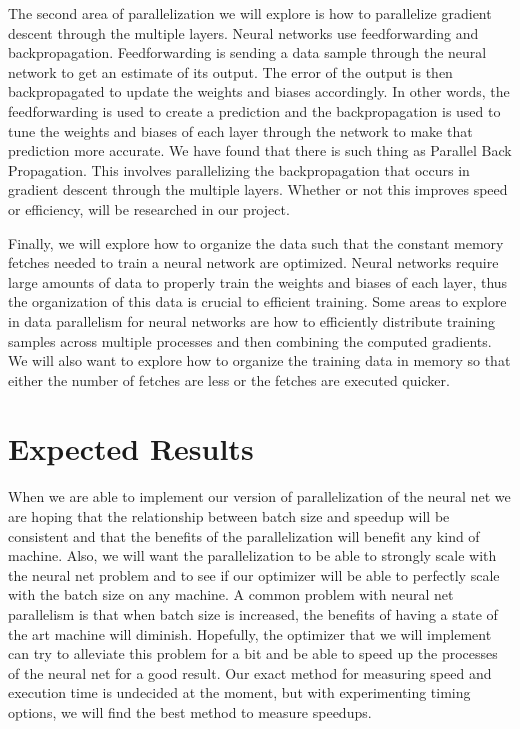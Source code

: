 \documentclass[twoside,twocolumn]{article}
\begin{document}
The second area of parallelization we will explore is how to parallelize gradient descent through the multiple layers. Neural networks use feedforwarding and backpropagation. Feedforwarding is sending a data sample through the neural network to get an estimate of its output. The error of the output is then backpropagated to update the weights and biases accordingly. In other words, the feedforwarding is used to create a prediction and the backpropagation is used to tune the weights and biases of each layer through the network to make that prediction more accurate. We have found that there is such thing as Parallel Back Propagation. This involves parallelizing the backpropagation that occurs in gradient descent through the multiple layers. Whether or not this improves speed or efficiency, will be researched in our project. 

Finally, we will explore how to organize the data such that the constant memory fetches needed to train a neural network are optimized. Neural networks require large amounts of data to properly train the weights and biases of each layer, thus the organization of this data is crucial to efficient training. Some areas to explore in data parallelism for neural networks are how to efficiently distribute training samples across multiple processes and then combining the computed gradients. We will also want to explore how to organize the training data in memory so that either the number of fetches are less or the fetches are executed quicker.



\section{Expected Results}

When we are able to implement our version of parallelization of the neural net we are hoping that the relationship between batch size and speedup will be consistent and that the benefits of the parallelization will benefit any kind of machine. Also, we will want the parallelization to be able to strongly scale with the neural net problem and to see if our optimizer will be able to perfectly scale with the batch size on any machine. A common problem with neural net parallelism is that when batch size is increased, the benefits of having a state of the art machine will diminish. Hopefully, the optimizer that we will implement can try to alleviate this problem for a bit and be able to speed up the processes of the neural net for a good result. Our exact method for measuring speed and execution time is undecided at the moment, but with experimenting timing options, we will find the best method to measure speedups.
\end{document}
